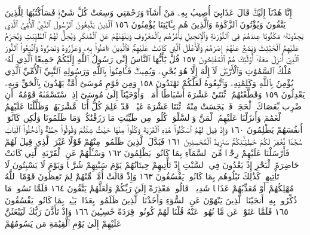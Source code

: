 إِنَّا هُدْنَآ إِلَيْكَۚ قَالَ عَذَابِيٓ أُصِيبُ بِهِۦ مَنْ أَشَآءُۖ وَرَحْمَتِي
وَسِعَتْ كُلَّ شَيْءࣲۚ فَسَأَكْتُبُهَا لِلَّذِينَ يَتَّقُونَ وَيُؤْتُونَ
ٱلزَّكَوٰةَ وَٱلَّذِينَ هُم بِـَٔايَٰتِنَا يُؤْمِنُونَ ١٥٦ ٱلَّذِينَ يَتَّبِعُونَ
ٱلرَّسُولَ ٱلنَّبِيَّ ٱلْأُمِّيَّ ٱلَّذِي يَجِدُونَهُۥ مَكْتُوبًا عِندَهُمْ
فِي ٱلتَّوْرَىٰةِ وَٱلْإِنجِيلِ يَأْمُرُهُم بِٱلْمَعْرُوفِ وَيَنْهَىٰهُمْ
عَنِ ٱلْمُنكَرِ وَيُحِلُّ لَهُمُ ٱلطَّيِّبَٰتِ وَيُحَرِّمُ عَلَيْهِمُ
ٱلْخَبَٰٓئِثَ وَيَضَعُ عَنْهُمْ إِصْرَهُمْ وَٱلْأَغْلَٰلَ ٱلَّتِي كَانَتْ
عَلَيْهِمْۚ فَٱلَّذِينَ ءَامَنُوا۟ بِهِۦ وَعَزَّرُوهُ وَنَصَرُوهُ وَٱتَّبَعُوا۟
ٱلنُّورَ ٱلَّذِيٓ أُنزِلَ مَعَهُۥٓ أُو۟لَٰٓئِكَ هُمُ ٱلْمُفْلِحُونَ ١٥٧
قُلْ يَٰٓأَيُّهَا ٱلنَّاسُ إِنِّي رَسُولُ ٱللَّهِ إِلَيْكُمْ جَمِيعًا ٱلَّذِي
لَهُۥ مُلْكُ ٱلسَّمَٰوَٰتِ وَٱلْأَرْضِۖ لَآ إِلَٰهَ إِلَّا هُوَ يُحْيِۦ وَيُمِيتُۖ
فَـَٔامِنُوا۟ بِٱللَّهِ وَرَسُولِهِ ٱلنَّبِيِّ ٱلْأُمِّيِّ ٱلَّذِي يُؤْمِنُ بِٱللَّهِ
وَكَلِمَٰتِهِۦ وَٱتَّبِعُوهُ لَعَلَّكُمْ تَهْتَدُونَ ١٥٨ وَمِن
قَوْمِ مُوسَىٰٓ أُمَّةࣱ يَهْدُونَ بِٱلْحَقِّ وَبِهِۦ يَعْدِلُونَ ١٥٩
وَقَطَّعْنَٰهُمُ ٱثْنَتَيْ عَشْرَةَ أَسْبَاطًا أُمَمࣰاۚ وَأَوْحَيْنَآ إِلَىٰ
مُوسَىٰٓ إِذِ ٱسْتَسْقَىٰهُ قَوْمُهُۥٓ أَنِ ٱضْرِب بِّعَصَاكَ ٱلْحَجَرَۖ
فَٱنۢبَجَسَتْ مِنْهُ ٱثْنَتَا عَشْرَةَ عَيْنࣰاۖ قَدْ عَلِمَ كُلُّ أُنَاسࣲ
مَّشْرَبَهُمْۚ وَظَلَّلْنَا عَلَيْهِمُ ٱلْغَمَٰمَ وَأَنزَلْنَا عَلَيْهِمُ
ٱلْمَنَّ وَٱلسَّلْوَىٰۖ كُلُوا۟ مِن طَيِّبَٰتِ مَا رَزَقْنَٰكُمْۚ وَمَا
ظَلَمُونَا وَلَٰكِن كَانُوٓا۟ أَنفُسَهُمْ يَظْلِمُونَ ١٦٠
وَإِذْ قِيلَ لَهُمُ ٱسْكُنُوا۟ هَٰذِهِ ٱلْقَرْيَةَ وَكُلُوا۟ مِنْهَا
حَيْثُ شِئْتُمْ وَقُولُوا۟ حِطَّةࣱ وَٱدْخُلُوا۟ ٱلْبَابَ سُجَّدࣰا
نَّغْفِرْ لَكُمْ خَطِيٓـَٰٔتِكُمْۚ سَنَزِيدُ ٱلْمُحْسِنِينَ ١٦١
فَبَدَّلَ ٱلَّذِينَ ظَلَمُوا۟ مِنْهُمْ قَوْلًا غَيْرَ ٱلَّذِي قِيلَ
لَهُمْ فَأَرْسَلْنَا عَلَيْهِمْ رِجْزࣰا مِّنَ ٱلسَّمَآءِ بِمَا كَانُوا۟
يَظْلِمُونَ ١٦٢ وَسْـَٔلْهُمْ عَنِ ٱلْقَرْيَةِ ٱلَّتِي كَانَتْ
حَاضِرَةَ ٱلْبَحْرِ إِذْ يَعْدُونَ فِي ٱلسَّبْتِ إِذْ تَأْتِيهِمْ
حِيتَانُهُمْ يَوْمَ سَبْتِهِمْ شُرَّعࣰا وَيَوْمَ لَا يَسْبِتُونَ لَا تَأْتِيهِمْۚ
كَذَٰلِكَ نَبْلُوهُم بِمَا كَانُوا۟ يَفْسُقُونَ ١٦٣
وَإِذْ قَالَتْ أُمَّةࣱ مِّنْهُمْ لِمَ تَعِظُونَ قَوْمًا ٱللَّهُ مُهْلِكُهُمْ أَوْ مُعَذِّبُهُمْ
عَذَابࣰا شَدِيدࣰاۖ قَالُوا۟ مَعْذِرَةً إِلَىٰ رَبِّكُمْ وَلَعَلَّهُمْ يَتَّقُونَ ١٦٤
فَلَمَّا نَسُوا۟ مَا ذُكِّرُوا۟ بِهِۦٓ أَنجَيْنَا ٱلَّذِينَ يَنْهَوْنَ عَنِ ٱلسُّوٓءِ
وَأَخَذْنَا ٱلَّذِينَ ظَلَمُوا۟ بِعَذَابِۭ بَـِٔيسِۭ بِمَا كَانُوا۟ يَفْسُقُونَ ١٦٥
فَلَمَّا عَتَوْا۟ عَن مَّا نُهُوا۟ عَنْهُ قُلْنَا لَهُمْ كُونُوا۟ قِرَدَةً خَٰسِـِٔينَ ١٦٦
وَإِذْ تَأَذَّنَ رَبُّكَ لَيَبْعَثَنَّ عَلَيْهِمْ إِلَىٰ يَوْمِ ٱلْقِيَٰمَةِ مَن يَسُومُهُمْ
